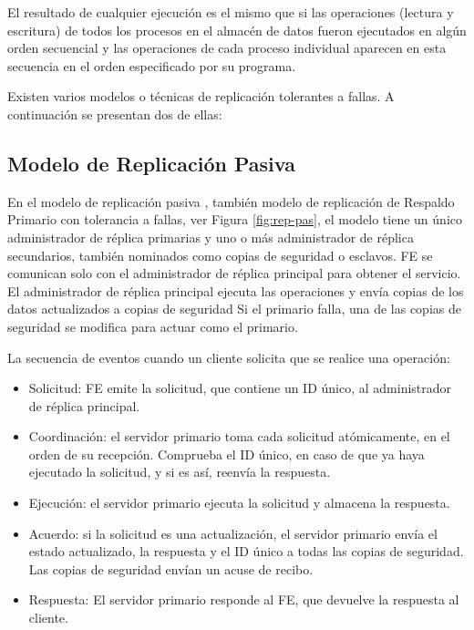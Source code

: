  
 El resultado de cualquier ejecución es el mismo que si las operaciones (lectura y escritura) de todos los procesos en el almacén de datos fueron ejecutados en algún orden secuencial y las operaciones de cada proceso individual aparecen en esta secuencia en el orden especificado por su programa. 
 
 
  Existen varios modelos o técnicas de replicación tolerantes a fallas. A continuaci\'on se presentan dos de ellas:
 
 
 \subsection{Modelo de Replicación Pasiva}
 
 En el modelo de replicación pasiva \cite{Pedone2000} , tambi\'en  modelo de replicación de Respaldo Primario con tolerancia a fallas, ver Figura \ref{fig:rep-pas}, el modelo tiene un único administrador de réplica  primarias y uno o más administrador de réplica secundarios, tambi\'en nominados como  copias de seguridad o esclavos. 
 FE se comunican solo con el administrador de réplica principal para obtener el servicio. El administrador de réplica principal ejecuta las operaciones y envía copias de los datos actualizados a copias de seguridad 
 Si el primario falla, una de las copias de seguridad se modifica para actuar como el primario.
 
 La secuencia de eventos cuando un cliente solicita que se realice una operación:
 
 \begin{itemize}
 	\item  Solicitud: FE emite la solicitud, que contiene un ID único, al administrador de réplica principal. 
 	\item Coordinación: el servidor primario toma cada solicitud atómicamente, en el orden de su recepción. Comprueba el ID único, en caso de que ya haya ejecutado la solicitud, y si es así,  reenvía la respuesta. 
 	\item Ejecución: el servidor primario ejecuta la solicitud y almacena la respuesta.
  	
 	\item Acuerdo: si la solicitud es una actualización, el servidor primario envía el estado actualizado, la respuesta y el ID único a todas las copias de seguridad. Las copias de seguridad envían un acuse de recibo. 
 	\item Respuesta: El servidor primario responde al FE, que devuelve la respuesta al cliente.
 \end{itemize}


